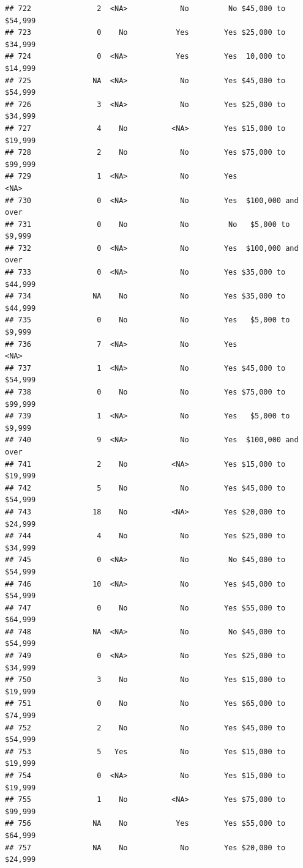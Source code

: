 \documentclass[man]{apa6}
\begin{document}
\begin{verbatim}
## 722               2  <NA>            No         No $45,000 to $54,999
## 723               0    No           Yes        Yes $25,000 to $34,999
## 724               0  <NA>           Yes        Yes  10,000 to $14,999
## 725              NA  <NA>            No        Yes $45,000 to $54,999
## 726               3  <NA>            No        Yes $25,000 to $34,999
## 727               4    No          <NA>        Yes $15,000 to $19,999
## 728               2    No            No        Yes $75,000 to $99,999
## 729               1  <NA>            No        Yes               <NA>
## 730               0  <NA>            No        Yes  $100,000 and over
## 731               0    No            No         No   $5,000 to $9,999
## 732               0  <NA>            No        Yes  $100,000 and over
## 733               0  <NA>            No        Yes $35,000 to $44,999
## 734              NA    No            No        Yes $35,000 to $44,999
## 735               0    No            No        Yes   $5,000 to $9,999
## 736               7  <NA>            No        Yes               <NA>
## 737               1  <NA>            No        Yes $45,000 to $54,999
## 738               0    No            No        Yes $75,000 to $99,999
## 739               1  <NA>            No        Yes   $5,000 to $9,999
## 740               9  <NA>            No        Yes  $100,000 and over
## 741               2    No          <NA>        Yes $15,000 to $19,999
## 742               5    No            No        Yes $45,000 to $54,999
## 743              18    No          <NA>        Yes $20,000 to $24,999
## 744               4    No            No        Yes $25,000 to $34,999
## 745               0  <NA>            No         No $45,000 to $54,999
## 746              10  <NA>            No        Yes $45,000 to $54,999
## 747               0    No            No        Yes $55,000 to $64,999
## 748              NA  <NA>            No         No $45,000 to $54,999
## 749               0  <NA>            No        Yes $25,000 to $34,999
## 750               3    No            No        Yes $15,000 to $19,999
## 751               0    No            No        Yes $65,000 to $74,999
## 752               2    No            No        Yes $45,000 to $54,999
## 753               5   Yes            No        Yes $15,000 to $19,999
## 754               0  <NA>            No        Yes $15,000 to $19,999
## 755               1    No          <NA>        Yes $75,000 to $99,999
## 756              NA    No           Yes        Yes $55,000 to $64,999
## 757              NA    No            No        Yes $20,000 to $24,999

\end{verbatim}
\end{document}
